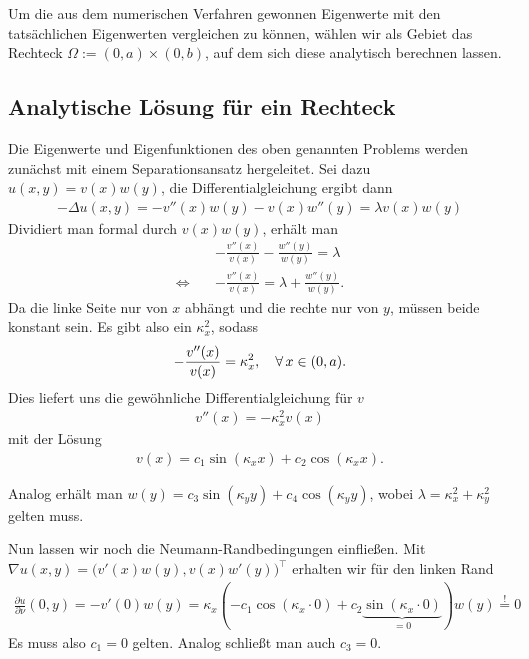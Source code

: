 \documentclass{article}
\theoremstyle{plain}
\begin{document}
Um die aus dem numerischen Verfahren gewonnen Eigenwerte mit den tatsächlichen Eigenwerten vergleichen zu können, wählen wir als Gebiet das Rechteck $\Omega := (0,a) \times (0,b)$, auf dem sich diese analytisch berechnen lassen.

\subsection{Analytische Lösung für ein Rechteck}

Die Eigenwerte und Eigenfunktionen des oben genannten Problems werden zunächst mit einem Separationsansatz hergeleitet.
Sei dazu $u(x,y) = v(x)w(y)$, die Differentialgleichung ergibt dann
\begin{align*}
	- \Delta u(x,y) = -v''(x) w(y) - v(x) w''(y) = \lambda v(x)w(y)
\end{align*}
Dividiert man formal durch $v(x)w(y)$, erhält man
\begin{align*}
	&-\frac{v''(x)}{v(x)} - \frac{w''(y)}{w(y)} = \lambda \\
	 \Leftrightarrow\quad &-\frac{v''(x)}{v(x)} = \lambda + \frac{w''(y)}{w(y)}.
\end{align*}
Da die linke Seite nur von $x$ abhängt und die rechte nur von $y$, müssen beide konstant sein. Es gibt also ein $\kappa_{x}^2$, sodass
\begin{align*}
	-\frac{v''(x)}{v(x)} = \kappa_{x}^2, \quad \forall \, x \in (0,a).
\end{align*}
Dies liefert uns die gewöhnliche Differentialgleichung für $v$
\begin{align*}
	v''(x) = -\kappa_{x}^2 v(x)
\end{align*}
mit der Lösung
\begin{align*}
	v(x) = c_1 \sin(\kappa_{x} x) + c_2 \cos(\kappa_{x} x).
\end{align*}

Analog erhält man $w(y) = c_3 \sin(\kappa_{y} y) + c_4 \cos(\kappa_{y} y)$, wobei $\lambda = \kappa_{x}^2 + \kappa_{y}^2$ gelten muss.

Nun lassen wir noch die Neumann-Randbedingungen einfließen. Mit $\nabla u(x,y) = \Big(v'(x)w(y), v(x)w'(y)\Big)^\top$ erhalten wir für den linken Rand
\begin{align*}
	\frac{\partial u}{\partial \nu}(0,y) = - v'(0)w(y) = \kappa_{x}(- c_1 \cos(\kappa_{x} \cdot 0) + c_2 \underbrace{\sin(\kappa_{x} \cdot 0)}_{=0})w(y) \stackrel{!}{=} 0
\end{align*}
Es muss also $c_1 = 0$ gelten. Analog schließt man auch $c_3 = 0$.
\end{document}

